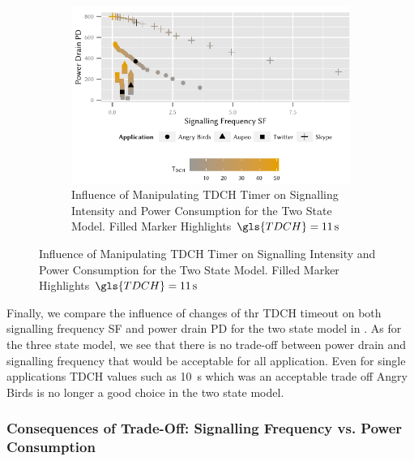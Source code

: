 \begin{figure}
	\begin{subfigure}[b]{\textwidth}
	\centering
	\includegraphics{network/network_traces/numerical_results/figures/2_state_signalling_vs_power_consumption}
	\caption{Influence of Manipulating \gls{TDCH} Timer on Signalling Intensity and Power Consumption for the Two State Model. Filled Marker Highlights \(\gls{TDCH} = \SI{11}{\second}\)}\label{fig:network:network_traces:numerical_results:two_states:trade_off}
	\end{subfigure}
\end{figure}
Finally, we compare the influence of changes of thr \gls{TDCH} timeout on both signalling frequency \gls{SF} and power drain \gls{PD} for the two state model in .
As for the three state model, we see that there is no trade-off between power drain and signalling frequency that would be acceptable for all application.
Even for single applications \gls{TDCH} values such as \SI{10}{\second} which was an acceptable trade off Angry Birds is no longer a good choice in the two state model.

\subsubsection*{Consequences of Trade-Off: Signalling Frequency vs. Power Consumption}\label{sec:network:network_traces:numerical_results:trade_off}


